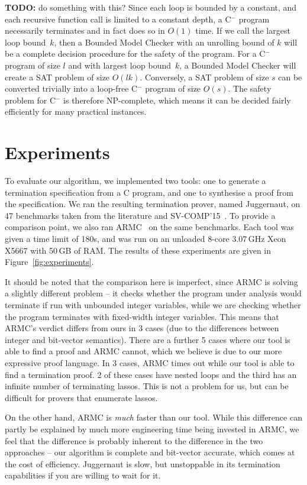 \documentclass[preprint]{sigplanconf}
\theoremstyle{definition}
\newcommand{\todo}[1]{{\bf TODO:} #1}
\newcommand{\newC}{C$^-$\xspace}
\begin{document}
\todo{do something with this?}
Since each loop is bounded by a constant, and each recursive function call is
limited to a constant depth, a \newC program necessarily terminates and in
fact does so in $O(1)$ time.  If we call the largest loop bound~$k$, then
a Bounded Model Checker with an unrolling bound of $k$ will be a complete
decision procedure for the safety of the program.  For a \newC program of
size $l$ and with largest loop bound~$k$, a Bounded Model Checker will
create a SAT problem of size $O(lk)$.  Conversely, a SAT problem
of size $s$ can be converted trivially into a loop-free \newC program
of size $O(s)$.  The safety problem for \newC is therefore NP-complete,
which means it can be decided fairly efficiently for many practical
instances.

\section{Experiments}

To evaluate our algorithm, we implemented two tools: one to generate a
termination specification from a C program, and one to synthesise a proof
from the specification.  We ran the resulting termination prover,
named {\sc Juggernaut}, on 47
benchmarks taken from the literature and SV-COMP'15~\cite{svcomp15}.  To
provide a comparison point, we also ran {\sc ARMC}~\cite{armc-website} on
the same benchmarks.  Each tool was given a time limit of 180s, and was
run on an unloaded 8-core 3.07\,GHz Xeon X5667 with 50\,GB of RAM.  The
results of these experiments are given in Figure~\ref{fig:experiments}.

It should be noted that the comparison here is imperfect, since {\sc ARMC}
is solving a slightly different problem -- it checks whether the program
under analysis would terminate if run with unbounded integer variables,
while we are checking whether the program terminates with fixed-width
integer variables.  This means that {\sc ARMC}'s verdict differs from ours
in 3 cases (due to the differences between integer and bit-vector
semantics).  There are a further 5 cases where our tool is able to find a
proof and {\sc ARMC} cannot, which we believe is due to our more expressive
proof language.  In 3 cases, {\sc ARMC} times out while our tool is able to
find a termination proof.  2 of these cases have nested loops and the
third has an infinite number of terminating lassos.  This is not a problem for us,
but can be difficult for provers that enumerate lassos.

On the other hand, {\sc ARMC} is \emph{much} faster than our tool.  While
this difference can partly be explained by much more engineering time being
invested in {\sc ARMC}, we feel that the difference is probably inherent to
the difference in the two approaches -- our algorithm is complete and
bit-vector accurate, which comes at the cost of efficiency.
{\sc Juggernaut} is slow, but unstoppable in its
termination capabilities if you are willing to wait for it.
\end{document}
